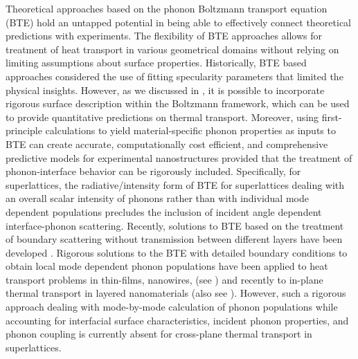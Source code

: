 \par Theoretical approaches based on the phonon Boltzmann transport equation (BTE) hold an untapped potential in being able to effectively connect theoretical predictions with experiments. The flexibility of BTE approaches allows for treatment of heat transport in various geometrical domains without relying on limiting assumptions about surface properties. Historically, BTE based approaches considered the use of fitting specularity parameters that limited the physical insights. However, as we discussed in , it is possible to incorporate rigorous surface description within the Boltzmann framework, which can be used to provide quantitative predictions on thermal transport. Moreover, using first-principle calculations to yield material-specific phonon properties as inputs to BTE can create accurate, computationally cost efficient, and comprehensive predictive models for experimental nanostructures provided that the treatment of phonon-interface behavior can be rigorously included. Specifically, for superlattices, the radiative/intensity form of BTE for superlattices \cite{RN267,RN348} dealing with an overall scalar intensity of phonons rather than with individual mode dependent populations precludes the inclusion of incident angle dependent interface-phonon scattering. Recently, solutions to BTE based on the treatment of boundary scattering without transmission between different layers have been developed \cite{RN328,RN372}. Rigorous solutions to the BTE with detailed boundary conditions to obtain local mode dependent phonon populations have been applied to heat transport problems in thin-films, nanowires, (see ) and recently to in-plane thermal transport in layered nanomaterials \cite{RN396} (also see ). However, such a rigorous approach dealing with mode-by-mode calculation of phonon populations while accounting for interfacial surface characteristics, incident phonon properties, and phonon coupling is currently absent for cross-plane thermal transport in superlattices.
